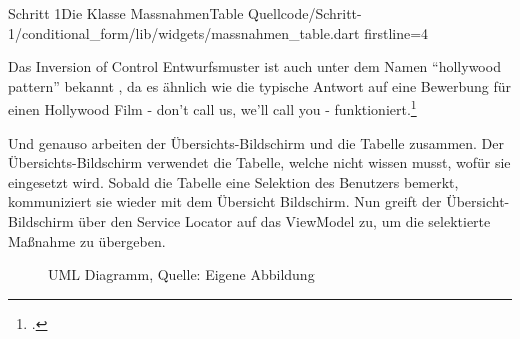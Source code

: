 \clearpage

\begin{alexlisting}{Schritt 1}{Die Klasse MassnahmenTable}
  {Quellcode/Schritt-1/conditional_form/lib/widgets/massnahmen_table.dart}
  {firstline=4}
  \label{lst:Schritt1KlasseMassnahmenTable}
\end{alexlisting}

\clearpage


Das Inversion of Control Entwurfsmuster ist auch unter dem Namen \enquote{hollywood pattern} bekannt , da es ähnlich wie die typische Antwort auf eine Bewerbung für einen Hollywood Film - don’t call us, we’ll call you - funktioniert.\footcite[Vgl.][]{fowler2005InversionOfControl}

Und genauso arbeiten der Übersichts-Bildschirm und die Tabelle zusammen.
Der Übersichts-Bildschirm verwendet die Tabelle, welche nicht wissen musst, wofür sie eingesetzt wird.
Sobald die Tabelle eine Selektion des Benutzers bemerkt, kommuniziert sie wieder mit dem Übersicht Bildschirm.
Nun greift der Übersicht-Bildschirm über den Service Locator auf das ViewModel zu, um die selektierte Maßnahme zu übergeben. 

\ifincludeall
  \begin{figure}[h]
    \centering


    \caption[UML Diagramm]{UML Diagramm, Quelle: Eigene Abbildung}
    \label{lst:UmlOnSelet}

  \end{figure}%
\fi







